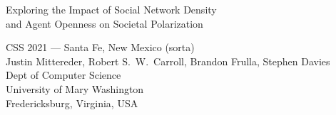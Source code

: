 \documentclass[12pt]{beamer}
\begin{document}
\begin{frame}[c]{}

\begin{center}
\Large
Exploring the Impact of Social Network Density\\and Agent Openness on Societal Polarization

\footnotesize
\vspace{.3in}
CSS 2021 --- Santa Fe, New Mexico (sorta)\\
\vspace{.1in}
Justin Mittereder, Robert S.~W.~Carroll, Brandon Frulla, Stephen Davies\\
\smallskip
\scriptsize
Dept of Computer Science\\
University of Mary Washington\\
Fredericksburg, Virginia, USA\\
\end{center}

\end{frame}
\end{document}
